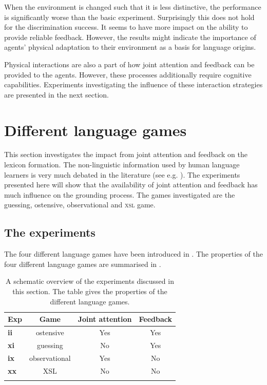 When the environment is changed such that it is less distinctive, the performance is significantly worse than the basic experiment. Surprisingly this does not hold for the discrimination success. It seems to have more impact on the ability to provide reliable feedback. However, the results might indicate the importance of agents' physical adaptation to their environment as a basis for language origins.

Physical interactions are also a part of how joint attention and feedback can be provided to the agents. However, these processes additionally require cognitive capabilities. Experiments investigating the influence of these interaction strategies are presented in the next section.

\section{Different language games}\label{s:par:feed}
This section investigates the impact from joint attention and feedback on the lexicon formation. The non-linguistic information used by human language learners is very much debated in the literature (see e.g. \citealt{bowerman:1988,barrett:1995}). The experiments presented here will show that the availability of joint attention and feedback has much influence on the grounding process. The games investigated are the guessing, ostensive, observational and {\scshape xsl} game.

\subsection{The experiments}

The four different language games have been introduced in . The properties of the four different language games are summarised in .

\begin{table}[h]
\centering
\begin{tabular}{lccc}
\lsptoprule
Exp & Game & Joint attention & Feedback\\
\midrule
{\bf ii} & ostensive & Yes & Yes\\
{\bf xi} & guessing & No & Yes\\
{\bf ix} & observational & Yes & No\\
{\bf xx} & XSL & No & No\\
\lspbottomrule
\end{tabular}
\caption{A schematic overview of the experiments discussed in this section. The table gives the properties of the different language games.}
\label{t:par:lg}
\end{table}


